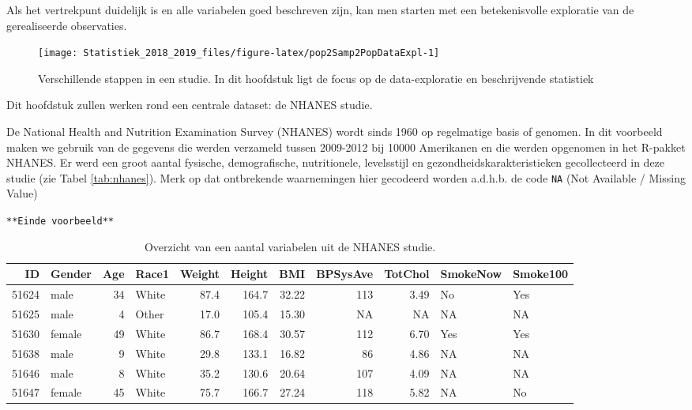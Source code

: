 \documentclass[12pt,dutch,coursenotes]{book}
\theoremstyle{definition}
\theoremstyle{definition}
\theoremstyle{definition}
\theoremstyle{remark}
\let\BeginKnitrBlock\begin \let\EndKnitrBlock\end
\begin{document}
Als het vertrekpunt duidelijk is en alle variabelen goed beschreven
zijn, kan men starten met een betekenisvolle exploratie van de
gerealiseerde observaties.

\begin{figure}

{\centering \texttt{[image: Statistiek\_2018\_2019\_files/figure-latex/pop2Samp2PopDataExpl-1]} 

}

\caption{Verschillende stappen in een studie. In dit hoofdstuk ligt de focus op de data-exploratie en beschrijvende statistiek}\label{fig:pop2Samp2PopDataExpl}
\end{figure}

Dit hoofdstuk zullen werken rond een centrale dataset: de NHANES studie.

\BeginKnitrBlock{example}[NHANES studie]
\protect\hypertarget{exm:nhanesEx}{}{\label{exm:nhanesEx} \iffalse (NHANES
studie) \fi{} }
\EndKnitrBlock{example}

De National Health and Nutrition Examination Survey (NHANES) wordt sinds
1960 op regelmatige basis of genomen. In dit voorbeeld maken we gebruik
van de gegevens die werden verzameld tussen 2009-2012 bij 10000
Amerikanen en die werden opgenomen in het R-pakket NHANES. Er werd een
groot aantal fysische, demografische, nutritionele, levelsstijl en
gezondheidskarakteristieken gecollecteerd in deze studie (zie Tabel
\ref{tab:nhanes}). Merk op dat ontbrekende waarnemingen hier gecodeerd
worden a.d.h.b. de code \texttt{NA} (Not Available / Missing Value)

\texttt{**Einde\ voorbeeld**}

\begin{table}

\caption{\label{tab:nhanesDatExpl}Overzicht van een aantal variabelen uit de NHANES studie.}
\centering
\begin{tabular}[t]{rlrlrrrrrll}
\toprule
ID & Gender & Age & Race1 & Weight & Height & BMI & BPSysAve & TotChol & SmokeNow & Smoke100\\
\midrule
51624 & male & 34 & White & 87.4 & 164.7 & 32.22 & 113 & 3.49 & No & Yes\\
51625 & male & 4 & Other & 17.0 & 105.4 & 15.30 & NA & NA & NA & NA\\
51630 & female & 49 & White & 86.7 & 168.4 & 30.57 & 112 & 6.70 & Yes & Yes\\
51638 & male & 9 & White & 29.8 & 133.1 & 16.82 & 86 & 4.86 & NA & NA\\
51646 & male & 8 & White & 35.2 & 130.6 & 20.64 & 107 & 4.09 & NA & NA\\
51647 & female & 45 & White & 75.7 & 166.7 & 27.24 & 118 & 5.82 & NA & No\\
\bottomrule
\end{tabular}
\end{table}
\end{document}
